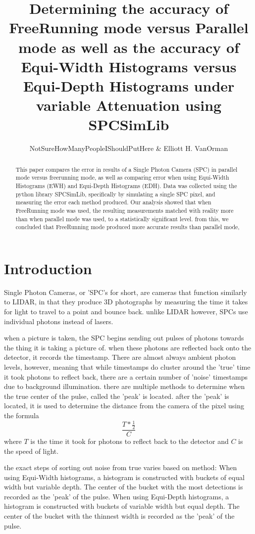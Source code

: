 \documentclass{article}
\title{Determining the accuracy of FreeRunning mode versus Parallel mode as well as the accuracy of Equi-Width Histograms versus Equi-Depth Histograms under variable Attenuation using SPCSimLib \cite{spc}}
\author{NotSureHowManyPeopleIShouldPutHere \& Elliott H. VanOrman}
\begin{document}
\maketitle

\begin{abstract}
This paper compares the error in results of a Single Photon Camera (SPC) in parallel mode versus freerunning mode, as well as comparing error when using Equi-Width Histograms (EWH) and Equi-Depth Histograms (EDH).
Data was collected using the python library SPCSimLib, specifically by simulating a single SPC pixel, and measuring the error each method produced.
Our analysis showed that when FreeRunning mode was used, the resulting measurements matched with reality more than when parallel mode was used, to a statistically significant level.
from this, we concluded that FreeRunning mode produced more accurate results than parallel mode,
\end{abstract}

\section*{Introduction}

Single Photon Cameras, or 'SPC's for short, are cameras that function similarly to LIDAR, in that they produce 3D photographs by measuring the time it takes for light to travel to a point and bounce back. unlike LIDAR however, SPCs use individual photons instead of lasers.

when a picture is taken, the SPC begins sending out pulses of photons towards the thing it is taking a picture of. when these photons are reflected back onto the detector, it records the timestamp. There are almost always ambient photon levels, however, meaning that while timestamps do cluster around the 'true' time it took photons to reflect back, there are a certain number of 'noise' timestamps due to background illumination. there are multiple methods to determine when the true center of the pulse, called the 'peak' is located. after the 'peak' is located, it is used to determine the distance from the camera of the pixel using the formula \[\frac{T*\frac{1}{2}}{C}\] where $T$ is the time it took for photons to reflect back to the detector and $C$ is the speed of light.

the exact steps of sorting out noise from true varies based on method: When using Equi-Width histograms, a histogram is constructed with buckets of equal width but variable depth. The center of the bucket with the most detections is recorded as the 'peak' of the pulse. When using Equi-Depth histograms, a histogram is constructed with buckets of variable width but equal depth. The center of the bucket with the thinnest width is recorded as the 'peak' of the pulse.
\end{document}
